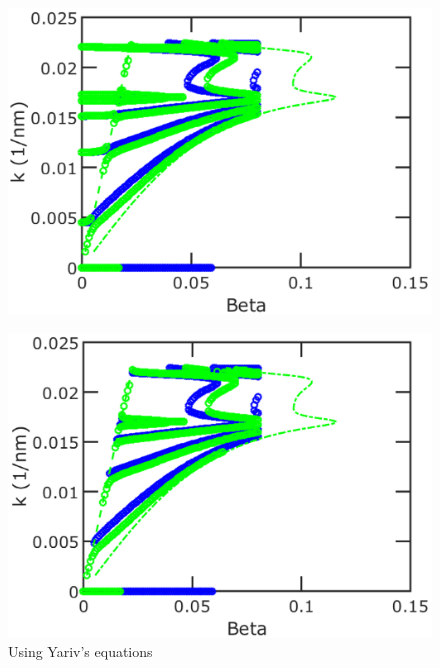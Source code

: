 \documentclass[12pt]{article}
\numberwithin{equation}{section}
\begin{document}
\begin{figure}[H]
\centering 
\vspace{-10pt}
\includegraphics[scale=.4]{Figures/HemispherePaperKvsBeta}
\caption{}
\vspace{-10pt}
\end{figure}

\begin{figure}[H]
\centering 
\vspace{-10pt}
\includegraphics[scale=.4]{Figures/HemispherePaperKvsBetaYariv}
\caption{Using Yariv's equations}
\vspace{-10pt}
\end{figure}

\end{document}
